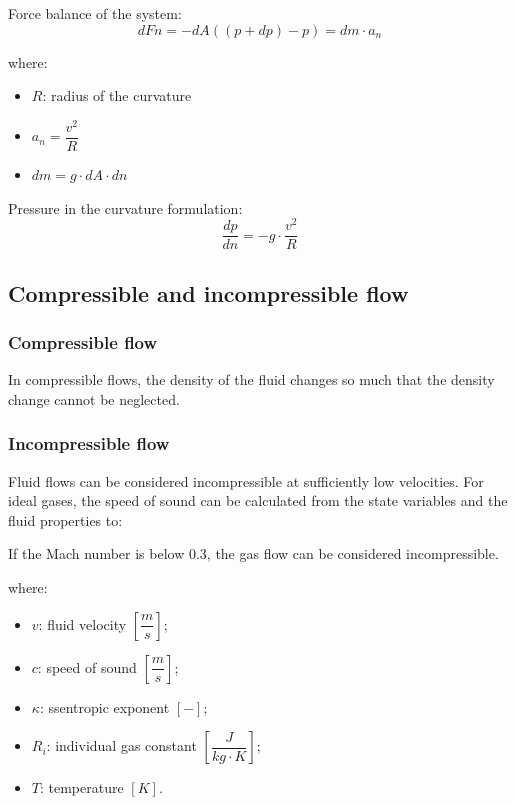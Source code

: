 \documentclass{article}
\begin{document}
Force balance of the system:
\[dFn = -dA\left(\left(p+dp\right)-p\right) = dm\cdot a_n\]

where:
\begin{itemize}
    \item $R$: radius of the curvature
    \item $a_n = \dfrac{v^2}{R}$
    \item $dm = g\cdot dA\cdot dn$
\end{itemize}

Pressure in the curvature formulation:
\[\frac{dp}{dn} = -g\cdot \frac{v^2}{R}\]

\subsection{Compressible and incompressible flow}
\subsubsection{Compressible flow}
In compressible flows, the density of the fluid changes so
much that the density change cannot be neglected.

\subsubsection{Incompressible flow}
Fluid flows can be considered incompressible at sufficiently low velocities.
For ideal gases, the speed of sound can be calculated from the state variables and the
fluid properties to:


If the Mach number is below 0.3, the gas flow can be considered
incompressible.


where:
\begin{itemize}
    \item $v$: fluid velocity $\left[\dfrac{m}{s}\right]$; \\
    \item $c$: speed of sound $\left[\dfrac{m}{s}\right]$; \\
    \item $\kappa$: ssentropic exponent $\left[-\right]$;\\
    \item $R_i$: individual gas constant $\left[\dfrac{J}{kg \cdot K}\right]$;\\
    \item $T$: temperature $\left[K\right]$.
\end{itemize}
\end{document}
